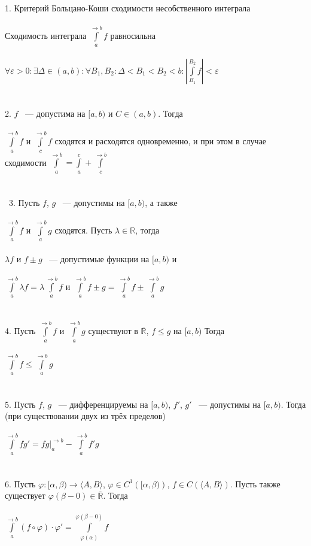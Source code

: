 \documentclass[../main.tex]{subfiles}
\begin{document}
1. Критерий Больцано-Коши сходимости несобственного интеграла\\\\
Сходимость интеграла $\int\limits^{\rightarrow b}_a f$ равносильна\\\\
$\forall \varepsilon > 0 : \exists \Delta \in (a, b) : \forall B_1, B_2 : \Delta < B_1 < B_2 < b : \left| \int\limits^{B_2}_{B_1} f \right| < \varepsilon$\\\\\\
2. $f$ ~--- допустима на $[a, b)$ и $C \in (a, b)$. Тогда \\\\
$\int\limits^{\rightarrow b}_a f$ и $\int\limits^{\rightarrow b}_c f$ сходятся и расходятся одновременно, и при этом в случае сходимости $\int\limits^{\rightarrow b}_a = \int\limits^c_a + \int\limits^{\rightarrow b}_c$ \\\\\\\
3. Пусть $f$, $g$ ~--- допустимы на $[a, b)$, а также \\\\
$\int\limits^{\rightarrow b}_a f$ и $\int\limits^{\rightarrow b}_a g$ сходятся. Пусть $\lambda \in \mathbb{R}$, тогда \\\\
$\lambda f$ и $f \pm g$ ~--- допустимые функции на $[a, b)$ и \\\\
$\int\limits^{\rightarrow b}_a \lambda f = \lambda \int\limits^{\rightarrow b}_a f$ и $\int\limits^{\rightarrow b}_a f \pm g = \int\limits^{\rightarrow b}_a f \pm \int\limits^{\rightarrow b}_a g$\\\\\\
4. Пусть $\int\limits^{\rightarrow b}_a f$ и $\int\limits^{\rightarrow b}_a g$ существуют в $\overline{\mathbb{R}}$, $f \leq g$ на $[a, b)$ Тогда \\\\
$\int\limits^{\rightarrow b}_a f \leq \int\limits^{\rightarrow b}_a g$ \\\\\\
5. Пусть $f$, $g$ ~--- дифференцируемы на $[a, b)$, $f'$, $g'$ ~--- допустимы на $[a, b)$. Тогда (при существовании двух из трёх пределов) \\\\
$\int\limits^{\rightarrow b}_a f g' = fg \bigg|^{\rightarrow b}_a - \int\limits^{\rightarrow b}_a f'g$ \\\\\\
6. Пусть $\varphi : [\alpha, \beta) \rightarrow \langle A, B \rangle$, $\varphi \in C^1 \left( [\alpha, \beta) \right)$, $f \in C \left( \langle A, B \rangle \right)$. Пусть также существует $\varphi(\beta - 0) \in \overline{\mathbb{R}}$. Тогда \\\\
$\int\limits^{\rightarrow b}_a (f \circ \varphi) \cdot \varphi' = \int\limits^{\varphi(\beta - 0)}_{\varphi(\alpha)} f$
       
\end{document}
